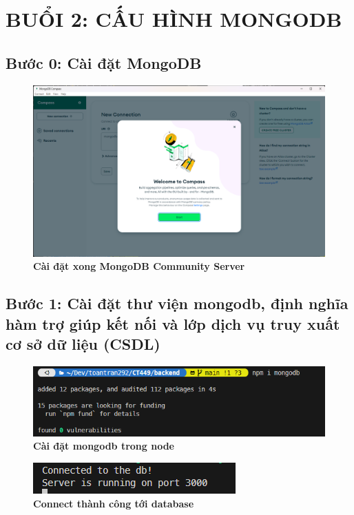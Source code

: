 \section*{BUỔI 2: CẤU HÌNH MONGODB}
\setcounter{section}{2}
{}
\subsection*{Bước 0: Cài đặt MongoDB}
\setcounter{subsection}{1}
\setcounter{figure}{0}
\begin{figure}[H]
  \centering
  \includegraphics[width=15cm]{images/chapterSecond/1.png}
  \caption{\bfseries Cài đặt xong MongoDB Community Server}
\end{figure}
\subsection*{Bước 1: Cài đặt thư viện mongodb, định nghĩa hàm trợ giúp kết nối và lớp dịch vụ truy xuất cơ sở dữ liệu (CSDL)}
\setcounter{subsection}{2}
\setcounter{figure}{0}
\begin{figure}[H]
  \centering
  \includegraphics[width=15cm]{images/chapterSecond/2.png}
  \caption{\bfseries Cài đặt mongodb trong node}
\end{figure}
\begin{figure}[H]
  \centering
  \includegraphics{images/chapterSecond/3.png}
  \caption{\bfseries Connect thành công tới database}
\end{figure}
